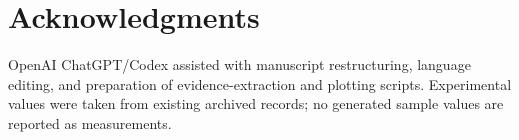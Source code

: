 \documentclass[conference,compsoc]{IEEEtran}
\begin{document}
\section*{Acknowledgments}
OpenAI ChatGPT/Codex assisted with manuscript restructuring, language editing, and preparation of evidence-extraction and plotting scripts. Experimental values were taken from existing archived records; no generated sample values are reported as measurements.



\end{document}
